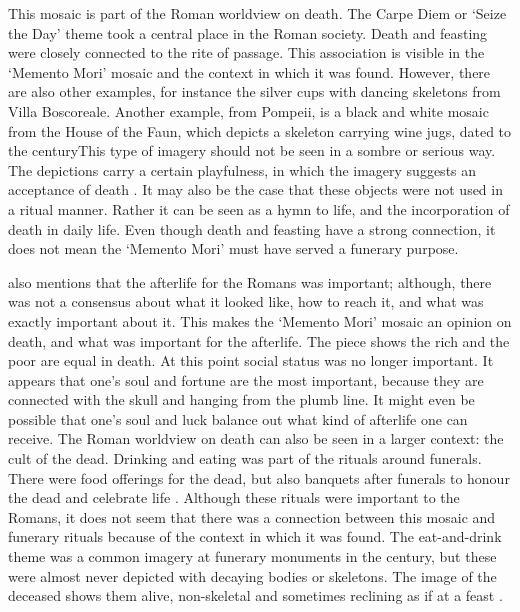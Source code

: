 This mosaic is part of the Roman worldview on death. The Carpe Diem or ‘Seize the Day’ theme took a central place in the Roman society. Death and feasting were closely connected to the rite of passage. This association is visible in the ‘Memento Mori’ mosaic and the context in which it was found. However, there are also other examples, for instance the silver cups with dancing skeletons from Villa Boscoreale. Another example, from Pompeii, is a black and white mosaic from the House of the Faun, which depicts a skeleton carrying wine jugs, dated to the  century\AD This type of imagery should not be seen in a sombre or serious way.  The depictions carry a certain playfulness, in which the imagery suggests an acceptance of death \parencite[25--27, 85--87]{Hope_2009}. It may also be the case that these objects were not used in a ritual manner. Rather it can be seen as a hymn to life, and the incorporation of death in daily life. Even though death and feasting have a strong connection, it does not mean the ‘Memento Mori’ must have served a funerary purpose. 

	\textcite{Hope_2009} also mentions that the afterlife for the Romans was important; although, there was not a consensus about what it looked like, how to reach it, and what was exactly important about it. This makes the ‘Memento Mori’ mosaic an opinion on death, and what was important for the afterlife.
	The piece shows the rich and the poor are equal in death. At this point social status was no longer important. It appears that one’s soul and fortune are the most important, because they are connected with the skull and hanging from the plumb line. It might even be possible that one’s soul and luck balance out what kind of afterlife one can receive.
	The Roman worldview on death can also be seen in a larger context: the cult of the dead. Drinking and eating was part of the rituals around funerals. There were food offerings for the dead, but also banquets after funerals to honour the dead and celebrate life \parencite[121--123]{Erasmo_2012}. Although these rituals were important to the Romans, it does not seem that there was a connection between this mosaic and funerary rituals because of the context in which it was found. The eat-and-drink theme was a common imagery at funerary monuments in the  century\AD, but these were almost never depicted with decaying bodies or skeletons. The image of the deceased shows them alive, non-skeletal and sometimes reclining as if at a feast \parencite[38]{Hope_2009}.

